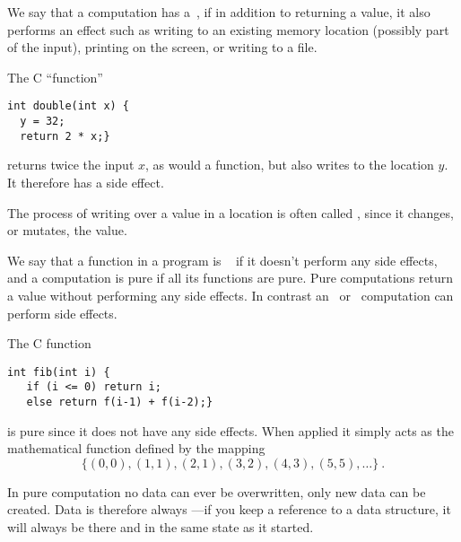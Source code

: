 \begin{flex}
\begin{definition}
We say that a computation has a~, if in addition to
returning a value, it also performs an effect such as writing to an
existing memory location (possibly part of the input), printing on the screen, or writing to a
file.
%
\end{definition}

\begin{example}
The C ``function''  
\begin{verbatim} 
int double(int x) { 
  y = 32; 
  return 2 * x;}
\end{verbatim}
returns twice the input $x$, as would a function, but also writes to
the location $y$.  It therefore has a side effect.
\end{example}
\end{flex}

\begin{gram}
The process of writing over a value in a location is often called ,
since it changes, or mutates, the value.
\end{gram}

\begin{flex}
\begin{definition}
We say that a function in a program is ~ if it doesn't perform any side
  effects, and a computation is pure if all its functions are pure.
%
Pure computations return a value without performing any side effects.
%
In contrast an~ or~ computation can
perform side effects.  
\end{definition}

\begin{example}
The C function 
\begin{verbatim}
int fib(int i) {
   if (i <= 0) return i; 
   else return f(i-1) + f(i-2);}
\end{verbatim}
is pure since it does not have any side effects.    When applied it 
simply acts as the mathematical function defined by the mapping 
~\[\{(0,0),(1,1),(2,1),(3,2),(4,3),(5,5), \ldots\}~. \]

\end{example}
\end{flex}
 
\begin{gram}
In pure computation no data can ever be overwritten, only new data can 
be created.   Data is therefore always ---if you keep a 
reference to a data structure, it will always be there and in the same 
state as it started. 
\end{gram}

